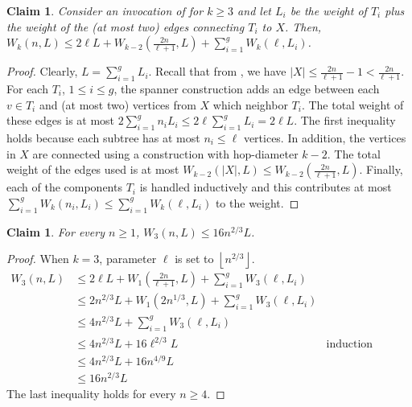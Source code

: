 \documentclass[11pt,english]{article}
\newcommand{\floor}[1]{\ensuremath{\left\lfloor#1\right\rfloor}}
\newtheorem{claim}[theorem]{Claim}
\begin{document}
\begin{claim}
Consider an invocation of  for $k\ge 3$ and let $L_i$ be the weight of $T_i$ plus the weight of the (at most two) edges connecting $T_i$ to $X$.
Then, $W_k(n,L) \le 2\ell L + W_{k-2}\left(\frac{2n}{\ell+1}, L\right) + \sum_{i=1}^g W_k(\ell, L_i)$.
\end{claim}
\begin{proof}
Clearly, $L = \sum_{i=1}^{g}L_i$. 
Recall that from , we have $|X| \le \frac{2n}{\ell+1}-1 < \frac{2n}{\ell+1}$.
For each $T_i$, $1 \le i \le g$, the spanner construction adds an edge between each $v \in T_i$ and (at most two) vertices from $X$ which neighbor $T_i$. The total weight of these edges is at most $2\sum_{i=1}^{g}n_iL_i \le 2\ell \sum_{i=1}^gL_i = 2\ell L$. The first inequality holds because each subtree has at most $n_i \le \ell$ vertices. In addition, the vertices in $X$ are connected using a construction with hop-diameter $k-2$. The total weight of the edges used is at most $W_{k-2}(|X|, L) \le W_{k-2}\left(\frac{2n}{\ell+1}, L\right)$.
Finally, each of the components $T_i$ is handled inductively and this contributes at most $\sum_{i=1}^gW_k(n_i, L_i)\le \sum_{i=1}^gW_k(\ell, L_i)$ to the weight.
\end{proof}

\begin{claim}\label{clm:ub:k-3}
For every $n \ge 1$, $W_3(n, L) \le 16n^{2/3}L$.
\end{claim}
\begin{proof}
When $k=3$, parameter $\ell$ is set to $\floor{n^{2/3}}$. 
\begin{align*}
W_3(n,L) &\le 2\ell L + W_{1}\left(\frac{2n}{\ell+1}, L\right) + \sum_{i=1}^g W_3(\ell, L_i)\\
& \le 2n^{2/3}L + W_1(2n^{1/3},L) + \sum_{i=1}^g W_3(\ell, L_i)\\
&\le 4n^{2/3}L + \sum_{i=1}^gW_3(\ell, L_i)\\
&\le 4n^{2/3}L + 16\ell^{2/3}L & \text{induction hypothesis}\\
&\le 4n^{2/3}L + 16 n^{4/9}L \\
&\le 16n^{2/3}L
\end{align*}
The last inequality holds for every $n \ge 4$. 
\end{proof}
\end{document}
